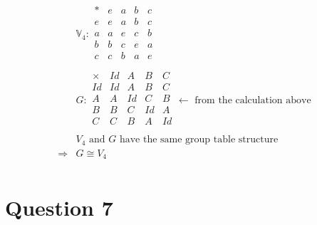 \documentclass{article}
\begin{document}
\begin{equation*}
    \begin{split}
        &\mathbb{V}_4:\begin{array}{c|cccc}
            \ast&e&a&b&c\\
            \hline
            e&e&a&b&c\\
            a&a&e&c&b\\
            b&b&c&e&a\\
            c&c&b&a&e\\
        \end{array}\\
        &G:\begin{array}{c|cccc}
            \times&Id&A&B&C\\
            \hline
            Id&Id&A&B&C\\
            A&A&Id&C&B\\
            B&B&C&Id&A\\
            C&C&B&A&Id\\
        \end{array}\leftarrow\text{ from the calculation above}\\
        &V_4\text{ and }G\text{ have the same group table structure}\\
        \Rightarrow&G\cong V_4\\
    \end{split}
\end{equation*}

\newpage

\section*{Question 7}

~
\end{document}
